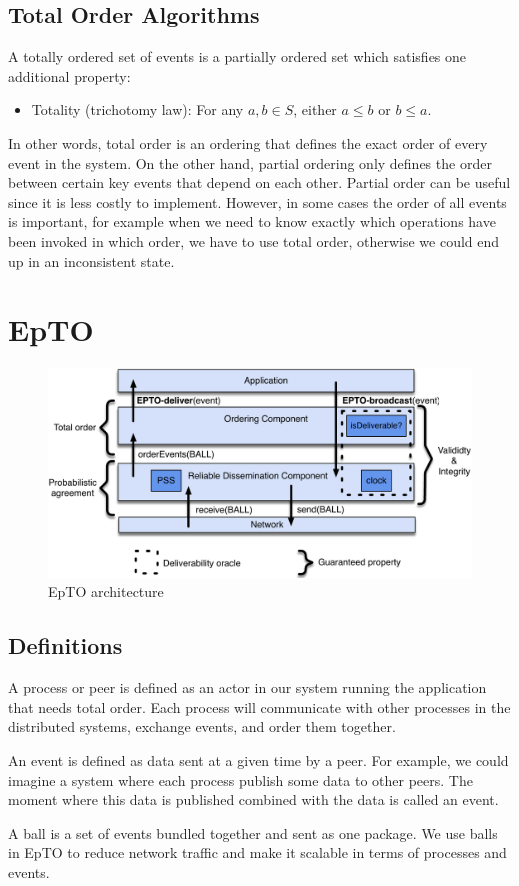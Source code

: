 \documentclass[10pt,conference,a4paper]{IEEEtran}
\begin{document}
\subsection{Total Order Algorithms}
A totally ordered set of events is a partially ordered set which satisfies one additional property:
\begin{itemize}
	\item Totality (trichotomy law): For any $a, b \in S$, either $a \leq b$  or $b \leq a$.
\end{itemize}
\par
In other words, total order is an ordering that defines the exact order of every event in the system. On the other hand, partial ordering only defines the order between certain key events that depend on each other. Partial order can be useful since it is less costly to implement. However, in some cases the order of all events is important, for example when we need to know exactly which operations have been invoked in which order, we have to use total order, otherwise we could end up in an inconsistent state.

\section{EpTO}
\begin{figure}
	\includegraphics[width=\linewidth]{figures/architecture.pdf}
	\caption{EpTO architecture \autocite{matos2015epto}}
	\label{fig:epto-architecture}
\end{figure}
\subsection{Definitions}
A process or peer is defined as an actor in our system running the application that needs total order. Each process will communicate with other processes in the distributed systems, exchange events, and order them together.
\par
An event is defined as data sent at a given time by a peer. For example, we could imagine a system where each process publish some data to other peers. The moment where this data is published combined with the data is called an event.
\par
A ball is a set of events bundled together and sent as one package. We use balls in EpTO to reduce network traffic and make it scalable in terms of processes and events.
\end{document}
